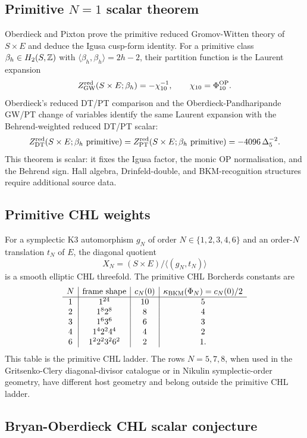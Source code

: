 \subsection*{Primitive \(N=1\) scalar theorem}

Oberdieck and Pixton prove the primitive reduced Gromov-Witten theory
of \(S\times E\) and deduce the Igusa cusp-form identity. For a
primitive class
\(\beta_h\in H_2(S,\mathbb{Z})\) with
\(\langle\beta_h,\beta_h\rangle=2h-2\), their partition function is the
Laurent expansion
\[
  Z^{\mathrm{red}}_{\mathrm{GW}}(S\times E;\beta_h)=-\chi_{10}^{-1},
  \qquad
  \chi_{10}=\Phi_{10}^{\mathrm{OP}}.
\]
Oberdieck's reduced DT/PT comparison and the
Oberdieck-Pandharipande GW/PT change of variables identify the same
Laurent expansion with the Behrend-weighted reduced DT/PT scalar:
\[
  Z^{\mathrm{red}}_{\mathrm{DT}}(S\times E;\beta_h\ \mathrm{primitive})
  =
  Z^{\mathrm{red}}_{\mathrm{PT}}(S\times E;\beta_h\ \mathrm{primitive})
  =
  -4096\,\Delta_5^{-2}.
\]
This theorem is scalar: it fixes the Igusa factor, the monic OP
normalisation, and the Behrend sign. Hall algebra,
Drinfeld-double, and BKM-recognition structures require additional
source data.

\subsection*{Primitive CHL weights}

For a symplectic K3 automorphism \(g_N\) of order
\(N\in\{1,2,3,4,6\}\) and an order-\(N\) translation \(t_N\) of \(E\),
the diagonal quotient
\[
  X_N=(S\times E)/\langle(g_N,t_N)\rangle
\]
is a smooth elliptic CHL threefold. The primitive CHL Borcherds
constants are
\[
\begin{array}{c|c|c|c}
N & \text{frame shape} & c_N(0) & \kappa_{\mathrm{BKM}}(\Phi_N)=c_N(0)/2\\
\hline
1 & 1^{24} & 10 & 5\\
2 & 1^8 2^8 & 8 & 4\\
3 & 1^6 3^6 & 6 & 3\\
4 & 1^4 2^2 4^4 & 4 & 2\\
6 & 1^2 2^2 3^2 6^2 & 2 & 1 .
\end{array}
\]
This table is the primitive CHL ladder. The rows \(N=5,7,8\), when
used in the Gritsenko-Clery diagonal-divisor catalogue or in Nikulin
symplectic-order geometry, have different host geometry and belong
outside the primitive CHL ladder.

\subsection*{Bryan-Oberdieck CHL scalar conjecture}

